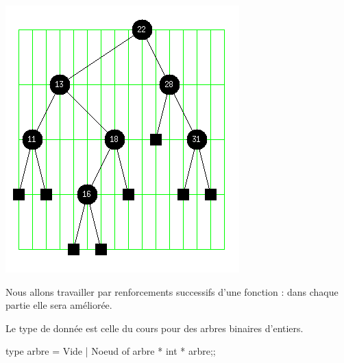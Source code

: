 \begin{minipage}{8cm}
\begin{center}
\end{center}
\end{minipage}
\begin{minipage}{8cm}
\begin{center}
\includegraphics[scale=0.6]{arbre}
\end{center}
\end{minipage}

Nous allons travailler par renforcements successifs d'une fonction : dans chaque partie elle sera améliorée.

Le type de donnée est celle du cours pour des arbres binaires d'entiers.
\begin{ocaml}
type arbre = Vide | Noeud of arbre * int * arbre;;
\end{ocaml}
\newpage

